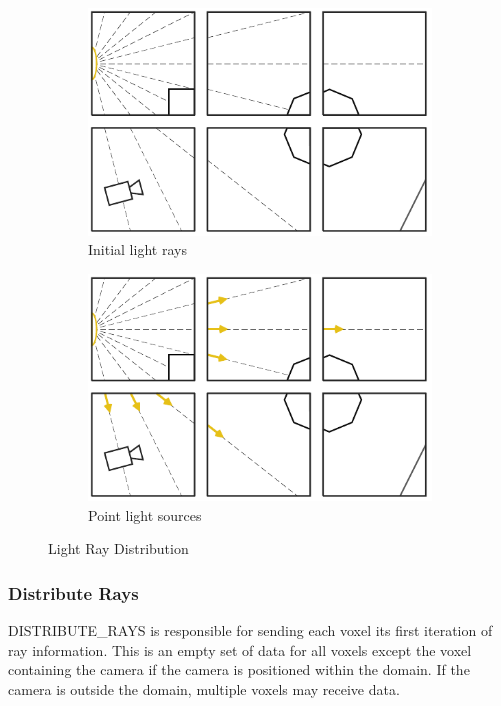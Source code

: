 \begin{figure}[!htb]
\centering
\begin{subfigure}{.49\columnwidth}
 \centering
  \includegraphics[width=.98\columnwidth]{drawings/Lights1.pdf}
  \caption{Initial light rays}
\end{subfigure}
\begin{subfigure}{.49\columnwidth}
 \centering
  \includegraphics[width=.98\columnwidth]{drawings/Lights2.pdf}
  \caption{Point light sources}
\end{subfigure}
\caption{Light Ray Distribution}
\label{fig:light}
\end{figure}

\subsubsection{Distribute Rays}

DISTRIBUTE\_RAYS is responsible for sending each voxel its first iteration of ray information.  This is an empty set of data for all voxels except the voxel containing the camera if the camera is positioned within the domain.  If the camera is outside the domain, multiple voxels may receive data.


